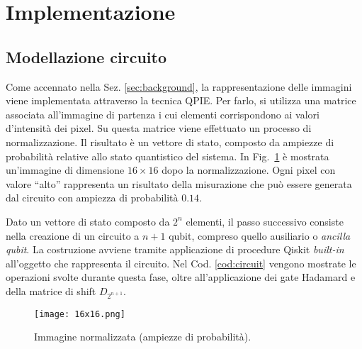 \section{Implementazione}\label{sec:implementazione}

\subsection{Modellazione circuito}
Come accennato nella Sez. \ref{sec:background}, la rappresentazione 
delle immagini viene implementata attraverso la tecnica QPIE. 
Per farlo, si utilizza una matrice associata all'immagine di partenza
i cui elementi corrispondono ai valori d'intensità dei pixel.
Su questa matrice viene effettuato un processo di normalizzazione.
Il risultato è un vettore di stato, composto da ampiezze di
probabilità relative allo stato quantistico del sistema. In Fig.~\ref{fig:16x16intensity_img} è mostrata un'immagine di 
dimensione $16 \times 16$ dopo la normalizzazione. Ogni pixel 
con valore ``alto'' rappresenta un risultato della misurazione 
che può essere generata dal circuito con ampiezza di probabilità $0.14$.

Dato un vettore di stato composto da $2^n$ elementi, 
il passo successivo consiste nella creazione di un circuito a $n+1$ qubit, 
compreso quello ausiliario o \textit{ancilla qubit}.
La costruzione avviene tramite applicazione di procedure Qiskit \textit{built-in} 
all'oggetto che rappresenta il circuito.
Nel Cod. \ref{cod:circuit} vengono mostrate le operazioni svolte durante
questa fase, oltre all'applicazione dei gate Hadamard e della matrice 
di shift $D_{2^{n+1}}$.

\begin{figure}
    \centering
    \texttt{[image: 16x16.png]}
    \caption{Immagine normalizzata (ampiezze di probabilità).}
    \label{fig:16x16intensity_img}
\end{figure}

